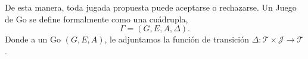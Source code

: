 De esta manera, toda jugada propuesta puede aceptarse o rechazarse. Un Juego de Go se define formalmente como una cuádrupla,
$$ \Gamma = (G, E, A, \Delta).$$
Donde a un Go $(G, E, A)$, le adjuntamos la función de transición $\Delta: \mathcal{T} \times \mathcal{J} \to \mathcal{T}$.
%	

